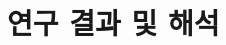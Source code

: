 \chapter{연구 결과 및 해석}%
\vspace*{2\baselineskip}%
%
\vspace*{5em}%
\vspace*{5em}%
\vspace*{5em}%
\vspace*{5em}%
%